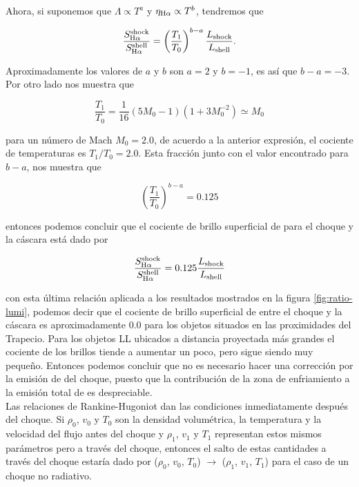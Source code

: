 Ahora, si suponemos que \(\Lambda \propto T^{a}\) y \(\eta_{\mathrm{H}\alpha{}} \propto T^{b}\), tendremos que

\begin{equation}
  \label{eq:ratio-brig1}
   \frac{S^{\text{shock}}_{\mathrm{H}\alpha}}{S^{\text{shell}}_{\mathrm{H}\alpha}} = \left(\frac{T_{1}}{T_{0}}\right)^{b-a} \frac{L_{\text{shock}}}{L_{\text{shell}}}. 
\end{equation}

Aproximadamente los valores de \(a\) y \(b\) son \(a = 2\) y \(b = -1\), es así que \(b - a = -3\). Por otro lado \citet{Henney:2002} nos muestra que

\begin{equation}
  \label{eq:ratio-tem}
  \frac{T_{1}}{T_{0}} = \frac{1}{16}(5M_{0} - 1)(1 + 3M^{-2}_{0}) \simeq M_{0}
\end{equation}

para un número de Mach \(M_{0} = 2.0\), de acuerdo a la anterior expresión, el cociente de temperaturas es \(T_{1}/T_{0} = 2.0\). Esta fracción junto con el valor encontrado para \(b-a\), nos muestra que

\begin{equation*}
  \label{eq:ratio-temp2}
   \left(\frac{T_{1}}{T_{0}}\right)^{b-a} = 0.125 
\end{equation*}

entonces podemos concluir que el cociente de brillo superficial de \ha{} para el choque y la cáscara está dado por

\begin{equation}
  \label{eq:ratio-b}
   \frac{S^{\text{shock}}_{\mathrm{H}\alpha}}{S^{\text{shell}}_{\mathrm{H}\alpha}} = 0.125 \frac{L_{\text{shock}}}{L_{\text{shell}}}
\end{equation}

con esta última relación aplicada a los resultados mostrados en la figura \ref{fig:ratio-lumi}, podemos decir que el cociente de brillo superficial de \ha{} entre el choque y la cáscara es aproximadamente 0.0 para los objetos situados en las proximidades del Trapecio. Para los objetos LL ubicados a distancia proyectada más grandes el cociente de los brillos tiende a aumentar un poco, pero sigue siendo muy pequeño. Entonces podemos concluir que no es necesario hacer una corrección por la emisión de \ha{} del choque, puesto que la contribución de la zona de enfriamiento a la emisión total de \ha{} es despreciable.\\   


Las relaciones de Rankine-Hugoniot dan las condiciones inmediatamente después del choque. Si \(\rho_{0}\), \(v_{0}\) y \(T_{0}\) son la densidad volumétrica, la temperatura y la velocidad del flujo antes del choque y \(\rho_{1}\), \(v_{1}\) y \(T_{1}\) representan estos mismos parámetros pero a través del choque, entonces el salto de estas cantidades a través del choque estaría dado por (\(\rho_{0}\), \(v_{0}\), \(T_{0}\)) \(\rightarrow\) (\(\rho_{1}\), \(v_{1}\), \(T_{1}\)) para el caso de un choque no radiativo.\\ 

